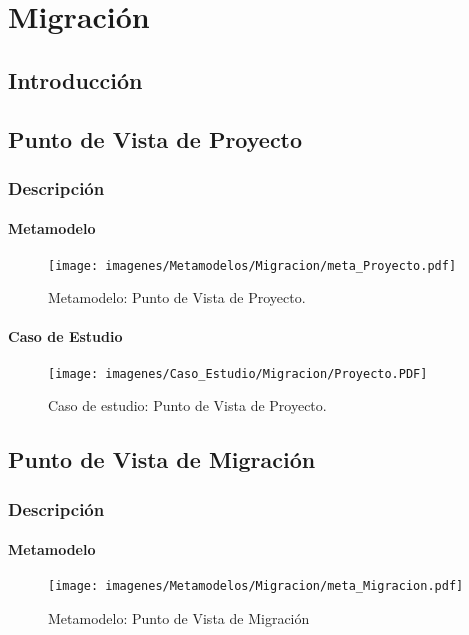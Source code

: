 \chapter{Migración}


\section{Introducción}

\section{Punto de Vista de Proyecto}
\subsection{Descripción}

\subsubsection{Metamodelo}
\begin{figure}[H]
	\centering
	\texttt{[image: imagenes/Metamodelos/Migracion/meta\_Proyecto.pdf]}
	\caption{Metamodelo: Punto de Vista de Proyecto.}
	\label{fig:gap_analysis}
\end{figure}

\subsubsection{Caso de Estudio}


\begin{figure}[H]
	\centering
	\texttt{[image: imagenes/Caso\_Estudio/Migracion/Proyecto.PDF]}
	\caption{Caso de estudio: Punto de Vista de Proyecto.}
	\label{fig:gap_analysis}
\end{figure}

\section{Punto de Vista de Migración}
\subsection{Descripción}


\subsubsection{Metamodelo}
\begin{figure}[H]
	\centering
	\texttt{[image: imagenes/Metamodelos/Migracion/meta\_Migracion.pdf]}
	\caption{Metamodelo: Punto de Vista de Migración}
	\label{fig:gap_analysis}
\end{figure}

